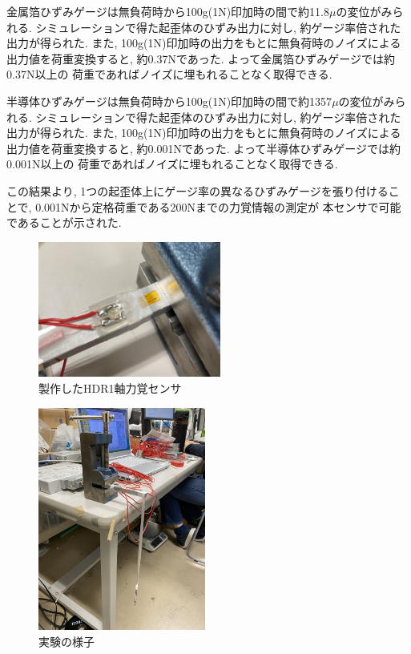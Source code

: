 金属箔ひずみゲージは無負荷時から100g(1N)印加時の間で約11.8$\mu$の変位がみられる. 
シミュレーションで得た起歪体のひずみ出力に対し, 約ゲージ率倍された出力が得られた.
また, 100g(1N)印加時の出力をもとに無負荷時のノイズによる出力値を荷重変換すると, 
約0.37Nであった. よって金属箔ひずみゲージでは約0.37N以上の
荷重であればノイズに埋もれることなく取得できる.

半導体ひずみゲージは無負荷時から100g(1N)印加時の間で約1357$\mu$の変位がみられる. 
シミュレーションで得た起歪体のひずみ出力に対し, 約ゲージ率倍された出力が得られた.
また, 100g(1N)印加時の出力をもとに無負荷時のノイズによる出力値を荷重変換すると, 
約0.001Nであった. よって半導体ひずみゲージでは約0.001N以上の
荷重であればノイズに埋もれることなく取得できる.

この結果より, 1つの起歪体上にゲージ率の異なるひずみゲージを張り付けることで, 
0.001Nから定格荷重である200Nまでの力覚情報の測定が
本センサで可能であることが示された. 

\begin{figure}[h]
  \begin{center}
    \includegraphics[width=6.0cm]{pic/realSensor.jpg}
    \caption{製作したHDR1軸力覚センサ}\label{fig:jissai}
  \end{center}
\end{figure}

\begin{figure}[h]
  \begin{center}
    \includegraphics[width=5.5cm]{pic/jikkennzu.jpg}
    \caption{実験の様子}\label{fig:jikkennzu}
  \end{center}
\end{figure}

